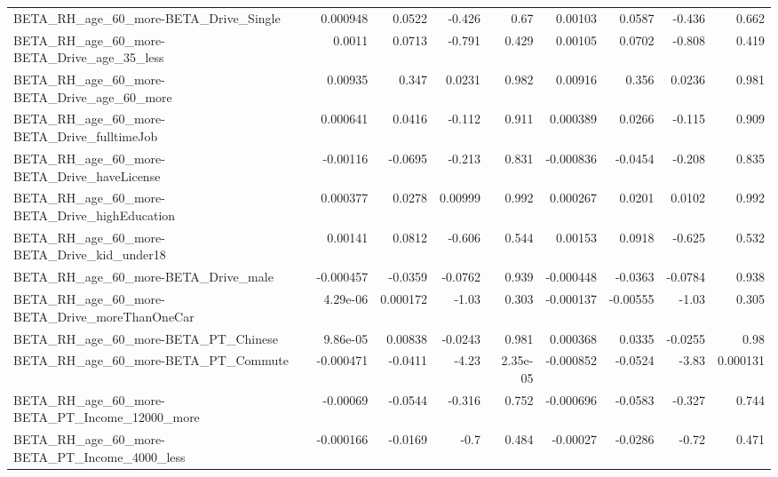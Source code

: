 \begin{tabular}{lrrrrrrrr}
BETA\_RH\_age\_60\_more-BETA\_Drive\_Single              &    0.000948 &       0.0522 &   -0.426 &     0.67 &    0.00103 &      0.0587 &       -0.436 &         0.662 \\
BETA\_RH\_age\_60\_more-BETA\_Drive\_age\_35\_less         &      0.0011 &       0.0713 &   -0.791 &    0.429 &    0.00105 &      0.0702 &       -0.808 &         0.419 \\
BETA\_RH\_age\_60\_more-BETA\_Drive\_age\_60\_more         &     0.00935 &        0.347 &   0.0231 &    0.982 &    0.00916 &       0.356 &       0.0236 &         0.981 \\
BETA\_RH\_age\_60\_more-BETA\_Drive\_fulltimeJob         &    0.000641 &       0.0416 &   -0.112 &    0.911 &   0.000389 &      0.0266 &       -0.115 &         0.909 \\
BETA\_RH\_age\_60\_more-BETA\_Drive\_haveLicense         &    -0.00116 &      -0.0695 &   -0.213 &    0.831 &  -0.000836 &     -0.0454 &       -0.208 &         0.835 \\
BETA\_RH\_age\_60\_more-BETA\_Drive\_highEducation       &    0.000377 &       0.0278 &  0.00999 &    0.992 &   0.000267 &      0.0201 &       0.0102 &         0.992 \\
BETA\_RH\_age\_60\_more-BETA\_Drive\_kid\_under18         &     0.00141 &       0.0812 &   -0.606 &    0.544 &    0.00153 &      0.0918 &       -0.625 &         0.532 \\
BETA\_RH\_age\_60\_more-BETA\_Drive\_male                &   -0.000457 &      -0.0359 &  -0.0762 &    0.939 &  -0.000448 &     -0.0363 &      -0.0784 &         0.938 \\
BETA\_RH\_age\_60\_more-BETA\_Drive\_moreThanOneCar      &    4.29e-06 &     0.000172 &    -1.03 &    0.303 &  -0.000137 &    -0.00555 &        -1.03 &         0.305 \\
BETA\_RH\_age\_60\_more-BETA\_PT\_Chinese                &    9.86e-05 &      0.00838 &  -0.0243 &    0.981 &   0.000368 &      0.0335 &      -0.0255 &          0.98 \\
BETA\_RH\_age\_60\_more-BETA\_PT\_Commute                &   -0.000471 &      -0.0411 &    -4.23 & 2.35e-05 &  -0.000852 &     -0.0524 &        -3.83 &      0.000131 \\
BETA\_RH\_age\_60\_more-BETA\_PT\_Income\_12000\_more      &    -0.00069 &      -0.0544 &   -0.316 &    0.752 &  -0.000696 &     -0.0583 &       -0.327 &         0.744 \\
BETA\_RH\_age\_60\_more-BETA\_PT\_Income\_4000\_less       &   -0.000166 &      -0.0169 &     -0.7 &    0.484 &   -0.00027 &     -0.0286 &        -0.72 &         0.471 \\

\end{tabular}
